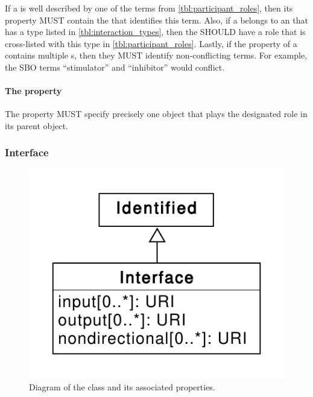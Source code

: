 If a  is well described by one of the terms from \ref{tbl:participant_roles}, then its  property MUST contain the  that identifies this term.
Also, if a  belongs to an  that has a type listed in \ref{tbl:interaction_types}, then the  SHOULD have a role that is cross-listed with this type in \ref{tbl:participant_roles}.
Lastly, if the  property of a  contains multiple
 s, then they MUST identify non-conflicting terms. For example, the SBO terms ``stimulator'' and ``inhibitor'' would conflict.


\paragraph{The  property}\label{sec:participant}

The  property MUST specify precisely one  object that plays the designated role in its parent  object.


\subsubsection{Interface}
\label{sec:Interface}

\begin{figure}[ht]
\begin{center}
\includegraphics[scale=0.6]{uml/interface}
\caption[]{Diagram of the  class and its associated properties.}
\label{uml:interface}
\end{center}
\end{figure}

